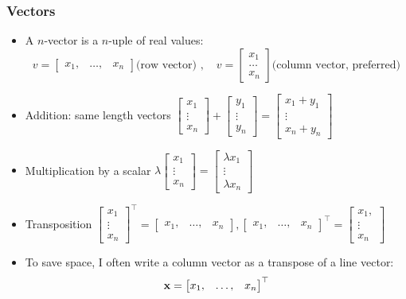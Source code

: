 \documentclass[8pt]{beamer}
\begin{document}
\begin{frame}
  \frametitle{Vectors}
  \begin{itemize}
  \item A $n$-vector is a $n$-uple of real values:
    $$
    v =
    \begin{bmatrix}
      x_1, & \dots, & x_n
    \end{bmatrix}
    \text{(row vector) },\quad
    v =
    \begin{bmatrix}
      x_1\\\dots\\x_n
    \end{bmatrix}
    \text{(column vector, preferred)}
    $$
  \item Addition: same length vectors
    $
    \begin{bmatrix}
      x_1\\\vdots\\x_n
    \end{bmatrix}
    +
    \begin{bmatrix}
      y_1\\\vdots\\y_n
    \end{bmatrix}
    =
    \begin{bmatrix}
      x_1+y_1\\\vdots\\x_n+y_n
    \end{bmatrix}
    $
  \item Multiplication by a scalar
    $
    \lambda\begin{bmatrix}
      x_1\\\vdots\\x_n
    \end{bmatrix}
    = 
    \begin{bmatrix}
      \lambda x_1\\\vdots\\\lambda x_n
    \end{bmatrix}
    $
  \item Transposition  
    $
    \begin{bmatrix}
      x_1\\\vdots\\x_n
    \end{bmatrix}^\top =
    \begin{bmatrix}
      x_1,&\dots,&x_n
    \end{bmatrix}
    ,
    \begin{bmatrix}
      x_1,&\dots,&x_n
    \end{bmatrix}^\top =
    \begin{bmatrix}
      x_1,\\\vdots\\x_n
    \end{bmatrix}
    $
  \item To save space, I often write a column vector as a transpose of a line vector:
    $$
    {\bf x} =   \begin{bmatrix}
      x_1,&\dots,&x_n
    \end{bmatrix}^\top
    $$
  \end{itemize}
\end{frame}
\end{document}
